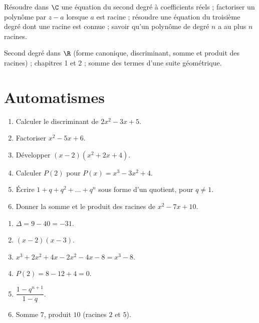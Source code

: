 
\begin{objectives}
Résoudre dans $\C$ une équation du second degré à coefficients réels ; factoriser un polynôme par $z-a$ lorsque $a$ est racine ; résoudre une équation du troisième degré dont une racine est connue ; savoir qu'un polynôme de degré $n$ a au plus $n$ racines.
\end{objectives}
\begin{prerequisites}
Second degré dans $\R$ (forme canonique, discriminant, somme et produit des racines) ; chapitres 1 et 2 ; somme des termes d'une suite géométrique.
\end{prerequisites}

\section{Automatismes}
\begin{fluency}
\begin{enumerate}
\item Calculer le discriminant de $2x^2-3x+5$.
\item Factoriser $x^2-5x+6$.
\item Développer $(x-2)\left(x^2+2x+4\right)$.
\item Calculer $P(2)$ pour $P(x)=x^3-3x^2+4$.
\item Écrire $1+q+q^2+\dots+q^{n}$ sous forme d'un quotient, pour $q\neq1$.
\item Donner la somme et le produit des racines de $x^2-7x+10$.
\end{enumerate}
\end{fluency}
\begin{solution}[Automatismes]
\begin{enumerate}
\item $\Delta=9-40=-31$.
\item $(x-2)(x-3)$.
\item $x^3+2x^2+4x-2x^2-4x-8=x^3-8$.
\item $P(2)=8-12+4=0$.
\item $\dfrac{1-q^{n+1}}{1-q}$.
\item Somme $7$, produit $10$ (racines $2$ et $5$).
\end{enumerate}
\end{solution}

\mxnewpage
